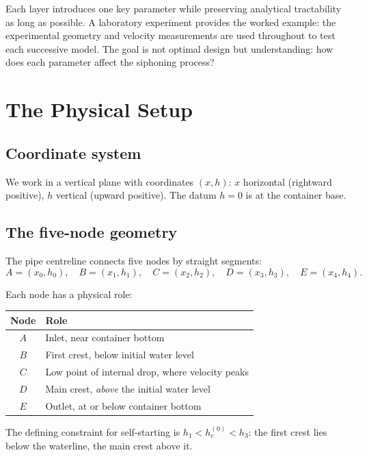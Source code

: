 \documentclass[11pt]{article}
\begin{document}
Each layer introduces one key parameter while preserving analytical tractability as long as possible. A laboratory experiment provides the worked example: the experimental geometry and velocity measurements are used throughout to test each successive model. The goal is not optimal design but understanding: how does each parameter affect the siphoning process?

\section{The Physical Setup}
\label{sec:setup}

\subsection{Coordinate system}

We work in a vertical plane with coordinates $(x, h)$: $x$ horizontal (rightward positive), $h$ vertical (upward positive). The datum $h = 0$ is at the container base.

\subsection{The five-node geometry}

The pipe centreline connects five nodes by straight segments:
\[
  A = (x_0, h_0), \quad B = (x_1, h_1), \quad C = (x_2, h_2), \quad D = (x_3, h_3), \quad E = (x_4, h_4).
\]

Each node has a physical role:
\begin{center}
\renewcommand{\arraystretch}{1.2}
\begin{tabular}{cl}
\toprule
Node & Role \\
\midrule
$A$ & Inlet, near container bottom \\
$B$ & First crest, below initial water level \\
$C$ & Low point of internal drop, where velocity peaks \\
$D$ & Main crest, \emph{above} the initial water level \\
$E$ & Outlet, at or below container bottom \\
\bottomrule
\end{tabular}
\end{center}

The defining constraint for self-starting is $h_1 < h_c^{(0)} < h_3$: the first crest lies below the waterline, the main crest above it.
\end{document}
